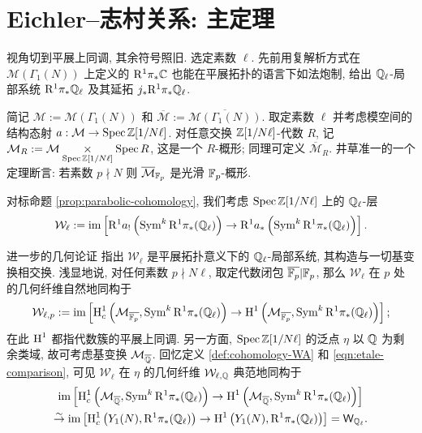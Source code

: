 \section{Eichler--志村关系: 主定理}\label{sec:Eichler-Shimura-cong-2}
视角切到平展上同调, 其余符号照旧. 选定素数 $\ell$. 先前用复解析方式在 $\mathcal{M}(\Gamma_1(N))$ 上定义的 $\mathrm{R}^1 \pi_* \mathbb{C}$ 也能在平展拓扑的语言下如法炮制, 给出 $\mathbb{Q}_\ell$-局部系统 $\mathrm{R}^1 \pi_* \mathbb{Q}_\ell$ 及其延拓 $j_* \mathrm{R}^1 \pi_* \mathbb{Q}_\ell$.

简记 $\mathcal{M} := \mathcal{M}(\Gamma_1(N))$ 和 $\overline{\mathcal{M}} := \overline{\mathcal{M}(\Gamma_1(N))}$. 取定素数 $\ell$ 并考虑模空间的结构态射 $a: \mathcal{M} \to \operatorname{Spec} \mathbb{Z}[1/N\ell]$. 对任意交换 $\mathbb{Z}[1/N\ell]$-代数 $R$, 记 $\mathcal{M}_R := \mathcal{M} \underset{\operatorname{Spec}\mathbb{Z}[1/N\ell]}{\times} \operatorname{Spec} R$, 这是一个 $R$-概形; 同理可定义 $\overline{\mathcal{M}}_R$. 井草准一的一个定理断言: 若素数 $p \nmid N$ 则 $\overline{\mathcal{M}}_{\mathbb{F}_p}$ 是光滑 $\mathbb{F}_p$-概形.

对标命题 \ref{prop:parabolic-cohomology}, 我们考虑 $\operatorname{Spec} \mathbb{Z}[1/N\ell]$ 上的 $\mathbb{Q}_\ell$-层
\begin{equation*}
	\mathcal{W}_\ell := \operatorname{im}\left[ \mathrm{R}^1 a_! \left( \operatorname{Sym}^k \mathrm{R}^1 \pi_* (\mathbb{Q}_\ell) \right) \to \mathrm{R}^1 a_* \left( \operatorname{Sym}^k \mathrm{R}^1 \pi_* (\mathbb{Q}_\ell) \right) \right].
\end{equation*}

进一步的几何论证 \cite[p.161]{Del71} 指出 $\mathcal{W}_\ell$ 是平展拓扑意义下的 $\mathbb{Q}_\ell$-局部系统, 其构造与一切基变换相交换. 浅显地说, 对任何素数 $p \nmid N\ell$, 取定代数闭包 $\overline{\mathbb{F}_p} | \mathbb{F}_p$, 那么 $\mathcal{W}_\ell$ 在 $p$ 处的几何纤维自然地同构于
\begin{equation}\label{eqn:parabolic-cohomology-p}
	\mathcal{W}_{\ell, p} := \operatorname{im}\left[ \operatorname{H}_c^1\left(\mathcal{M}_{\overline{\mathbb{F}_p}}, \operatorname{Sym}^k \mathrm{R}^1 \pi_* (\mathbb{Q}_\ell) \right) \to \operatorname{H}^1\left(\mathcal{M}_{\overline{\mathbb{F}_p}}, \operatorname{Sym}^k \mathrm{R}^1 \pi_* (\mathbb{Q}_\ell) \right) \right];
\end{equation}
在此 $\operatorname{H}^1$ 都指代数簇的平展上同调. 另一方面, $\operatorname{Spec} \mathbb{Z}[1/N\ell]$ 的泛点 $\eta$ 以 $\mathbb{Q}$ 为剩余类域, 故可考虑基变换 $\mathcal{M}_{\overline{\mathbb{Q}}}$. 回忆定义 \ref{def:cohomology-WA} 和 \eqref{eqn:etale-comparison}, 可见 $\mathcal{W}_\ell$ 在 $\eta$ 的几何纤维 $\mathcal{W}_{\ell, \mathbb{Q}}$ 典范地同构于 
\begin{multline*}
	\operatorname{im}\left[ \operatorname{H}_c^1\left(\mathcal{M}_{\overline{\mathbb{Q}}}, \operatorname{Sym}^k \mathrm{R}^1 \pi_* (\mathbb{Q}_\ell) \right) \to \operatorname{H}^1\left(\mathcal{M}_{\overline{\mathbb{Q}}}, \operatorname{Sym}^k \mathrm{R}^1 \pi_* (\mathbb{Q}_\ell) \right) \right] \\
	\stackrel{\sim}{\rightarrow} \operatorname{im}\left[ \operatorname{H}_c^1\left(Y_1(N), \mathrm{R}^1 \pi_* (\mathbb{Q}_\ell) \right) \to \operatorname{H}^1\left(Y_1(N), \mathrm{R}^1 \pi_* (\mathbb{Q}_\ell) \right) \right] = \mathsf{W}_{\mathbb{Q}_\ell}.
\end{multline*}

